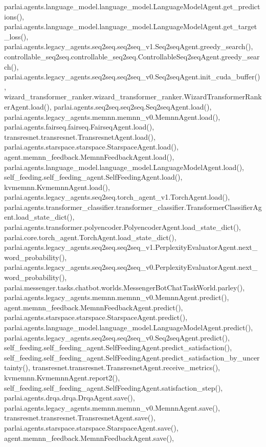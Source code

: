 parlai.\+agents.\+language\+\_\+model.\+language\+\_\+model.\+Language\+Model\+Agent.\+get\+\_\+predictions(), parlai.\+agents.\+language\+\_\+model.\+language\+\_\+model.\+Language\+Model\+Agent.\+get\+\_\+target\+\_\+loss(), parlai.\+agents.\+legacy\+\_\+agents.\+seq2seq.\+seq2seq\+\_\+v1.\+Seq2seq\+Agent.\+greedy\+\_\+search(), controllable\+\_\+seq2seq.\+controllable\+\_\+seq2seq.\+Controllable\+Seq2seq\+Agent.\+greedy\+\_\+search(), parlai.\+agents.\+legacy\+\_\+agents.\+seq2seq.\+seq2seq\+\_\+v0.\+Seq2seq\+Agent.\+init\+\_\+cuda\+\_\+buffer(), wizard\+\_\+transformer\+\_\+ranker.\+wizard\+\_\+transformer\+\_\+ranker.\+Wizard\+Transformer\+Ranker\+Agent.\+load(), parlai.\+agents.\+seq2seq.\+seq2seq.\+Seq2seq\+Agent.\+load(), parlai.\+agents.\+legacy\+\_\+agents.\+memnn.\+memnn\+\_\+v0.\+Memnn\+Agent.\+load(), parlai.\+agents.\+fairseq.\+fairseq.\+Fairseq\+Agent.\+load(), transresnet.\+transresnet.\+Transresnet\+Agent.\+load(), parlai.\+agents.\+starspace.\+starspace.\+Starspace\+Agent.\+load(), agent.\+memnn\+\_\+feedback.\+Memnn\+Feedback\+Agent.\+load(), parlai.\+agents.\+language\+\_\+model.\+language\+\_\+model.\+Language\+Model\+Agent.\+load(), self\+\_\+feeding.\+self\+\_\+feeding\+\_\+agent.\+Self\+Feeding\+Agent.\+load(), kvmemnn.\+Kvmemnn\+Agent.\+load(), parlai.\+agents.\+legacy\+\_\+agents.\+seq2seq.\+torch\+\_\+agent\+\_\+v1.\+Torch\+Agent.\+load(), parlai.\+agents.\+transformer\+\_\+classifier.\+transformer\+\_\+classifier.\+Transformer\+Classifier\+Agent.\+load\+\_\+state\+\_\+dict(), parlai.\+agents.\+transformer.\+polyencoder.\+Polyencoder\+Agent.\+load\+\_\+state\+\_\+dict(), parlai.\+core.\+torch\+\_\+agent.\+Torch\+Agent.\+load\+\_\+state\+\_\+dict(), parlai.\+agents.\+legacy\+\_\+agents.\+seq2seq.\+seq2seq\+\_\+v1.\+Perplexity\+Evaluator\+Agent.\+next\+\_\+word\+\_\+probability(), parlai.\+agents.\+legacy\+\_\+agents.\+seq2seq.\+seq2seq\+\_\+v0.\+Perplexity\+Evaluator\+Agent.\+next\+\_\+word\+\_\+probability(), parlai.\+messenger.\+tasks.\+chatbot.\+worlds.\+Messenger\+Bot\+Chat\+Task\+World.\+parley(), parlai.\+agents.\+legacy\+\_\+agents.\+memnn.\+memnn\+\_\+v0.\+Memnn\+Agent.\+predict(), agent.\+memnn\+\_\+feedback.\+Memnn\+Feedback\+Agent.\+predict(), parlai.\+agents.\+starspace.\+starspace.\+Starspace\+Agent.\+predict(), parlai.\+agents.\+language\+\_\+model.\+language\+\_\+model.\+Language\+Model\+Agent.\+predict(), parlai.\+agents.\+legacy\+\_\+agents.\+seq2seq.\+seq2seq\+\_\+v0.\+Seq2seq\+Agent.\+predict(), self\+\_\+feeding.\+self\+\_\+feeding\+\_\+agent.\+Self\+Feeding\+Agent.\+predict\+\_\+satisfaction(), self\+\_\+feeding.\+self\+\_\+feeding\+\_\+agent.\+Self\+Feeding\+Agent.\+predict\+\_\+satisfaction\+\_\+by\+\_\+uncertainty(), transresnet.\+transresnet.\+Transresnet\+Agent.\+receive\+\_\+metrics(), kvmemnn.\+Kvmemnn\+Agent.\+report2(), self\+\_\+feeding.\+self\+\_\+feeding\+\_\+agent.\+Self\+Feeding\+Agent.\+satisfaction\+\_\+step(), parlai.\+agents.\+drqa.\+drqa.\+Drqa\+Agent.\+save(), parlai.\+agents.\+legacy\+\_\+agents.\+memnn.\+memnn\+\_\+v0.\+Memnn\+Agent.\+save(), transresnet.\+transresnet.\+Transresnet\+Agent.\+save(), parlai.\+agents.\+starspace.\+starspace.\+Starspace\+Agent.\+save(), agent.\+memnn\+\_\+feedback.\+Memnn\+Feedback\+Agent.\+save(), 